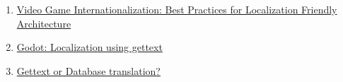 \begin{enumerate}
\item \sloppy\href{https://daydigital.com/video-game-internationalization-best-practices}{Video Game Internationalization: Best Practices for Localization Friendly Architecture}

\item \href{https://docs.godotengine.org/en/latest/tutorials/i18n/localization_using_gettext.html}{Godot: Localization using gettext}

\item \href{https://stackoverflow.com/a/15343103/14377142}{Gettext or Database translation?}
\end{enumerate}